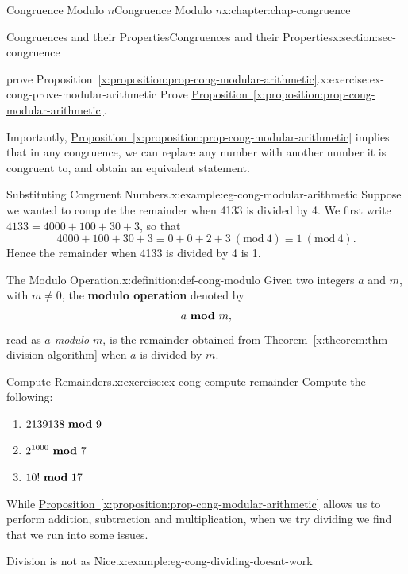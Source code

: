 \documentclass[oneside,10pt,]{book}
\newcommand{\xreffont}{\relax}
\newcommand{\terminology}[1]{\textbf{#1}}
\numberwithin{equation}{section}
\newcommand{\Mod}[1]{\ \left(\mathrm{mod}\ #1\right)}
\newcommand{\mmod}[1]{\ \mathrm{\bf mod}\ #1}
\begin{document}
\begin{chapterptx}{Congruence Modulo \(n\)}{}{Congruence Modulo \(n\)}{}{}{x:chapter:chap-congruence}
\begin{sectionptx}{Congruences and their Properties}{}{Congruences and their Properties}{}{}{x:section:sec-congruence}
\begin{inlineexercise}{prove Proposition~{\xreffont\ref*{x:proposition:prop-cong-modular-arithmetic}}.}{x:exercise:ex-cong-prove-modular-arithmetic}
Prove \hyperref[x:proposition:prop-cong-modular-arithmetic]{Proposition~{\xreffont\ref{x:proposition:prop-cong-modular-arithmetic}}}.%
\end{inlineexercise}
Importantly, \hyperref[x:proposition:prop-cong-modular-arithmetic]{Proposition~{\xreffont\ref{x:proposition:prop-cong-modular-arithmetic}}} implies that in any congruence, we can replace any number with another number it is congruent to, and obtain an equivalent statement.%
\begin{example}{Substituting Congruent Numbers.}{x:example:eg-cong-modular-arithmetic}%
Suppose we wanted to compute the remainder when 4133 is divided by 4. We first write \(4133 = 4000 + 100 + 30 + 3\), so that%
\begin{equation*}
4000 + 100 + 30 + 3 \equiv 0 + 0 + 2 + 3 \Mod{4} \equiv 1 \Mod{4}\text{.}
\end{equation*}
Hence the remainder when 4133 is divided by 4 is 1.%
\end{example}
\begin{definition}{The Modulo Operation.}{x:definition:def-cong-modulo}%
Given two integers \(a\) and \(m\), with \(m \ne 0\), the \terminology{modulo operation} denoted by%
\begin{equation*}
a \mmod{m}\text{,}
\end{equation*}
read as \emph{\(a\) modulo \(m\)}, is the remainder obtained from \hyperref[x:theorem:thm-division-algorithm]{Theorem~{\xreffont\ref{x:theorem:thm-division-algorithm}}} when \(a\) is divided by \(m\). \label{g:notation:id431562}%
\end{definition}
\begin{inlineexercise}{Compute Remainders.}{x:exercise:ex-cong-compute-remainder}%
Compute the following:%
\begin{enumerate}[label=(\alph*)]
\item{}\(\displaystyle 2139138 \mmod 9\)%
\item{}\(\displaystyle 2^{1000} \mmod 7\)%
\item{}\(\displaystyle 10! \mmod 17\)%
\end{enumerate}
%
\end{inlineexercise}
While \hyperref[x:proposition:prop-cong-modular-arithmetic]{Proposition~{\xreffont\ref{x:proposition:prop-cong-modular-arithmetic}}} allows us to perform addition, subtraction and multiplication, when we try dividing we find that we run into some issues.%
\begin{example}{Division is not as Nice.}{x:example:eg-cong-dividing-doesnt-work}%

\end{example}
\end{sectionptx}
\end{chapterptx}
\end{document}
